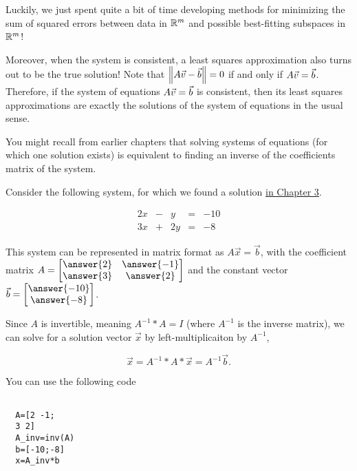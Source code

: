 \documentclass{ximera}
\begin{document}
Luckily, we just spent quite a bit of time developing methods for minimizing the sum of squared errors between data in $\mathbb{R}^m$ and possible best-fitting subspaces in $\mathbb{R}^m$!

Moreover, when the system is consistent, a least squares approximation also turns out to be the true solution! Note that $\left\|A\vec{v}-\vec{b}\right\|=0$ if and only if
$A\vec{v}=\vec{b}$. Therefore, if the system of equations
$A\vec{v}=\vec{b}$ is consistent, then its least squares
approximations are exactly the solutions of the system of equations in
the usual sense.

You might recall from earlier chapters that solving systems of equations (for which one solution exists) is equivalent to finding an inverse of the coefficients matrix of the system. 

\begin{example}

Consider the following system, for which we found a solution \href{https://ximera.osu.edu/appliedlinearalgebra/c3ChapterThree/learningActivities/m3LearningActivities/modThreeSystems/matricesAreSystemsOfEquations3}{in Chapter 3}. 



$$\begin{matrix}
  2x& -&y&=&-10\\
  3x & +&2y&= &-8
\end{matrix}$$



This system can be represented in matrix format as $A\vec{x}=\vec{b}$, with the coefficient matrix $A=\begin{bmatrix}
  \answer{2} & \answer{-1}\\ \answer{3} & \answer{2}
\end{bmatrix}$ and the constant vector $\vec{b}=\begin{bmatrix}
  \answer{-10} \\ \answer{-8}
\end{bmatrix}$.

Since $A$ is invertible, meaning $A^{-1}*A=I$ (where $A^{-1}$ is the inverse matrix), we can solve for a solution vector $\vec{x}$ by left-multiplicaiton by $A^{-1}$, 

$$\vec{x}=A^{-1}*A*\vec{x}=A^{-1}\vec{b}.$$

You can use the following code

\begin{verbatim}
  
  A=[2 -1;
  3 2]
  A_inv=inv(A)
  b=[-10;-8]
  x=A_inv*b


\end{verbatim}
\end{example}
\end{document}
